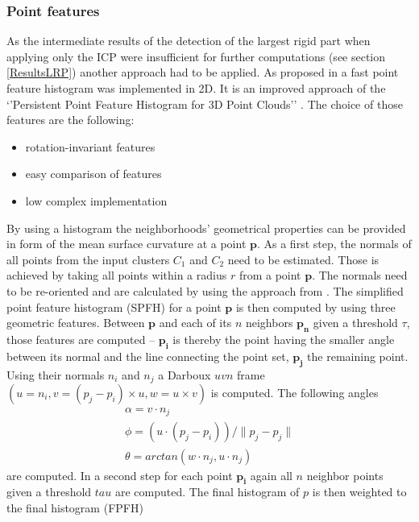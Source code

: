 \subsubsection{Point features}
As the intermediate results of the detection of the largest rigid part when applying only the ICP were insufficient for further computations (see section \ref{ResultsLRP}) another approach had to be applied. As proposed in \cite{Mitra07} a fast point feature histogram \cite{FPFH} was implemented in 2D. It is an improved approach of the `'Persistent Point Feature Histogram for 3D Point Clouds'' \cite{PPFH}. The choice of those features are the following: 
\begin{itemize}
	\item rotation-invariant features
	\item easy comparison of features
	\item low complex implementation
\end{itemize}
By using a histogram the neighborhoods' geometrical properties can be provided in form of the mean surface curvature at a point $\boldsymbol{p}$. As a first step, the normals of all points from the input clusters $C_1$ and $C_2$ need to be estimated. Those is achieved by taking all points within a radius $r$ from a point $\boldsymbol{p}$. The normals need to be re-oriented and are calculated by using the approach from \cite{normals}. The simplified point feature histogram (SPFH) for a point $\boldsymbol{p}$ is then computed by using three geometric features. Between $\boldsymbol{p}$ and each of its $n$ neighbors $\boldsymbol{p_n}$ given a threshold $\tau$, those features are computed -- $\boldsymbol{p_i}$ is thereby the point having the smaller angle between its normal and the line connecting the point set, $\boldsymbol{p_j}$ the remaining point. Using their normals $n_i$ and $n_j$ a Darboux $uvn$ frame $(u = n_i, v = (p_j - p_i) \times u, w = u \times v)$ is computed. The following angles
\begin{equation}
\begin{split}
\alpha = v \cdot n_j
\\
\phi = (u \cdot (p_j - p_i))/\|p_j - p_j\|
\\
\theta = arctan(w \cdot n_j, u \cdot n_j)
\end{split}
\label{eq:AngularVariations}
\end{equation}
are computed. In a second step for each point $\boldsymbol{p_i}$ again all $n$ neighbor points given a threshold $tau$ are computed. The final histogram of $p$ is then weighted to the final histogram (FPFH)
